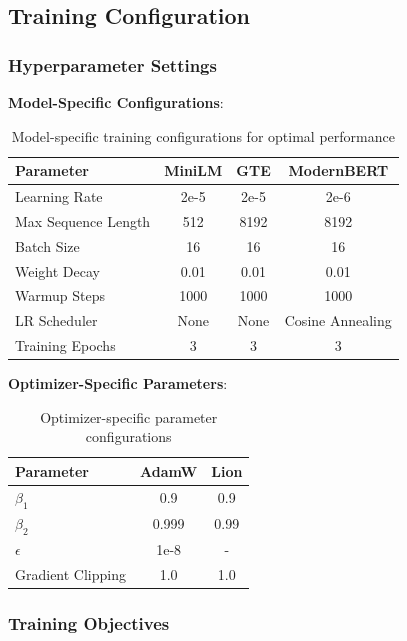\subsection{Training Configuration}

\subsubsection{Hyperparameter Settings}

\textbf{Model-Specific Configurations}:

\begin{table}[h!]
\centering
\begin{tabular}{|l|c|c|c|}
\hline
\textbf{Parameter} & \textbf{MiniLM} & \textbf{GTE} & \textbf{ModernBERT} \\
\hline
Learning Rate & 2e-5 & 2e-5 & 2e-6 \\
\hline
Max Sequence Length & 512 & 8192 & 8192 \\
\hline
Batch Size & 16 & 16 & 16 \\
\hline
Weight Decay & 0.01 & 0.01 & 0.01 \\
\hline
Warmup Steps & 1000 & 1000 & 1000 \\
\hline
LR Scheduler & None & None & Cosine Annealing \\
\hline
Training Epochs & 3 & 3 & 3 \\
\hline
\end{tabular}
\caption{Model-specific training configurations for optimal performance}
\label{tab:training_config}
\end{table}

\textbf{Optimizer-Specific Parameters}:

\begin{table}[h!]
\centering
\begin{tabular}{|l|c|c|}
\hline
\textbf{Parameter} & \textbf{AdamW} & \textbf{Lion} \\
\hline
$\beta_1$ & 0.9 & 0.9 \\
\hline
$\beta_2$ & 0.999 & 0.99 \\
\hline
$\epsilon$ & 1e-8 & - \\
\hline
Gradient Clipping & 1.0 & 1.0 \\
\hline
\end{tabular}
\caption{Optimizer-specific parameter configurations}
\label{tab:optimizer_config}
\end{table}

\subsubsection{Training Objectives}

